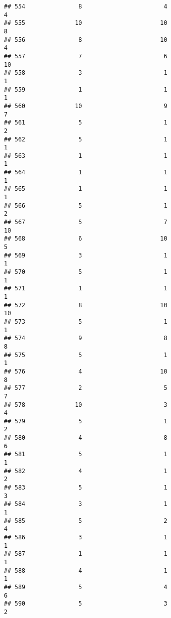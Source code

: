 \documentclass[
]{article}
\begin{document}
\begin{verbatim}
## 554               8                       4                        4
## 555              10                      10                        8
## 556               8                      10                        4
## 557               7                       6                       10
## 558               3                       1                        1
## 559               1                       1                        1
## 560              10                       9                        7
## 561               5                       1                        2
## 562               5                       1                        1
## 563               1                       1                        1
## 564               1                       1                        1
## 565               1                       1                        1
## 566               5                       1                        2
## 567               5                       7                       10
## 568               6                      10                        5
## 569               3                       1                        1
## 570               5                       1                        1
## 571               1                       1                        1
## 572               8                      10                       10
## 573               5                       1                        1
## 574               9                       8                        8
## 575               5                       1                        1
## 576               4                      10                        8
## 577               2                       5                        7
## 578              10                       3                        4
## 579               5                       1                        2
## 580               4                       8                        6
## 581               5                       1                        1
## 582               4                       1                        2
## 583               5                       1                        3
## 584               3                       1                        1
## 585               5                       2                        4
## 586               3                       1                        1
## 587               1                       1                        1
## 588               4                       1                        1
## 589               5                       4                        6
## 590               5                       3                        2

\end{verbatim}
\end{document}
